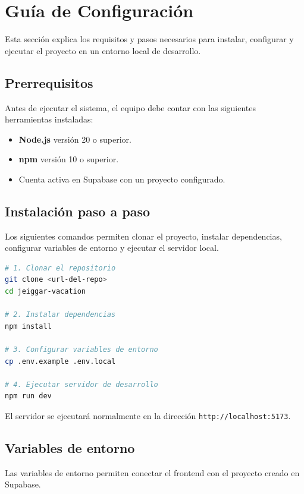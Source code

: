 \documentclass[12pt,letterpaper]{article}
\newcommand{\code}[1]{\nolinkurl{#1}}
\begin{document}
\section{Guía de Configuración}

Esta sección explica los requisitos y pasos necesarios para instalar, configurar y ejecutar el proyecto en un entorno local de desarrollo.

\subsection{Prerrequisitos}

Antes de ejecutar el sistema, el equipo debe contar con las siguientes herramientas instaladas:

\begin{itemize}
    \item \textbf{Node.js} versión 20 o superior.
    \item \textbf{npm} versión 10 o superior.
    \item Cuenta activa en Supabase con un proyecto configurado.
\end{itemize}

\subsection{Instalación paso a paso}

Los siguientes comandos permiten clonar el proyecto, instalar dependencias, configurar variables de entorno y ejecutar el servidor local.

\begin{lstlisting}[language=bash]
# 1. Clonar el repositorio
git clone <url-del-repo>
cd jeiggar-vacation

# 2. Instalar dependencias
npm install

# 3. Configurar variables de entorno
cp .env.example .env.local

# 4. Ejecutar servidor de desarrollo
npm run dev
\end{lstlisting}

El servidor se ejecutará normalmente en la dirección \code{http://localhost:5173}.

\subsection{Variables de entorno}

Las variables de entorno permiten conectar el frontend con el proyecto creado en Supabase.
\end{document}
